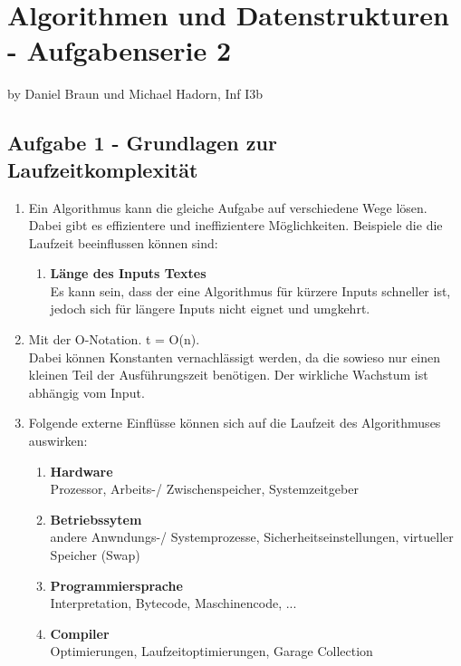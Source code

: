 \chapter*{Algorithmen und Datenstrukturen - Aufgabenserie 2}
\begin{flushright}
by Daniel Braun und Michael Hadorn, Inf I3b
\end{flushright}
\section*{Aufgabe 1 - Grundlagen zur Laufzeitkomplexität}
\begin{enumerate}
	\item %
	Ein Algorithmus kann die gleiche Aufgabe auf verschiedene Wege lösen. Dabei gibt es effizientere und ineffizientere Möglichkeiten.
	Beispiele die die Laufzeit beeinflussen können sind:
	\begin{enumerate}
		\item \textbf{Länge des Inputs Textes}\\
		Es kann sein, dass der eine Algorithmus für kürzere Inputs schneller ist, jedoch sich für längere Inputs nicht eignet und umgkehrt.
			
	\end{enumerate}
	
	\item %
	Mit der O-Notation. t = O(n).\\
	Dabei können Konstanten vernachlässigt werden, da die sowieso nur einen kleinen Teil der Ausführungszeit benötigen. Der wirkliche Wachstum ist abhängig vom Input.
	
	\item %
	Folgende externe Einflüsse können sich auf die Laufzeit des Algorithmuses auswirken:\\
	\begin{enumerate}
		\item \textbf{Hardware}\\
		Prozessor, Arbeits-/ Zwischenspeicher, Systemzeitgeber
		\item \textbf{Betriebssytem}\\
		andere Anwndungs-/ Systemprozesse, Sicherheitseinstellungen, virtueller Speicher (Swap)
		\item \textbf{Programmiersprache}\\
		Interpretation, Bytecode, Maschinencode, ...
		\item \textbf{Compiler}\\
		Optimierungen, Laufzeitoptimierungen, Garage Collection
	\end{enumerate}
	

\end{enumerate}

